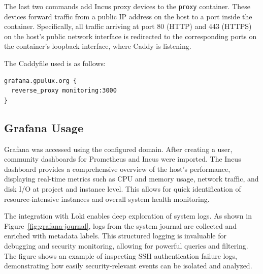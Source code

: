 The last two commands add Incus proxy devices\cite{incus-proxy-device} to the \texttt{proxy} container. These devices forward traffic from a public IP address on the host to a port inside the container. Specifically, all traffic arriving at port 80 (HTTP) and 443 (HTTPS) on the host's public network interface is redirected to the corresponding ports on the container's loopback interface, where Caddy is listening.

The Caddyfile used is as follows:

\begin{lstlisting}[caption={Caddyfile configuration to reverse proxy Grafana.}]
grafana.gpulux.org {
  reverse_proxy monitoring:3000
}
\end{lstlisting}

\subsection*{Grafana Usage}

Grafana was accessed using the configured domain. After creating a user, community dashboards for Prometheus and Incus were imported. The Incus dashboard provides a comprehensive overview of the host's performance, displaying real-time metrics such as CPU and memory usage, network traffic, and disk I/O at project and instance level. This allows for quick identification of resource-intensive instances and overall system health monitoring.

The integration with Loki enables deep exploration of system logs. As shown in Figure~\ref{fig:grafana-journal}, logs from the system journal are collected and enriched with metadata labels. This structured logging is invaluable for debugging and security monitoring, allowing for powerful queries and filtering. The figure shows an example of inspecting SSH authentication failure logs, demonstrating how easily security-relevant events can be isolated and analyzed.

